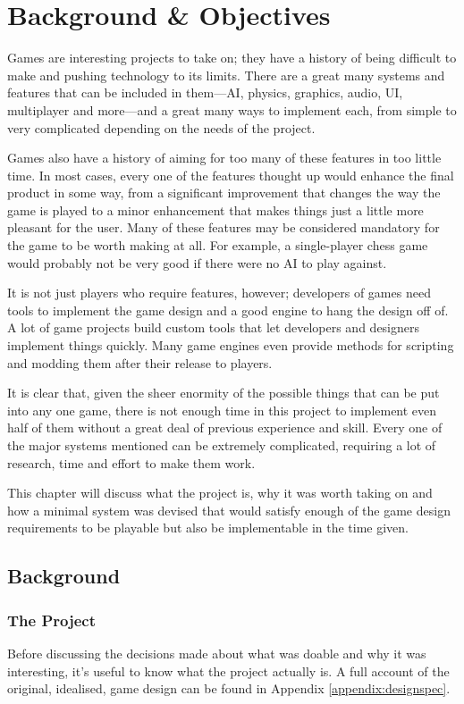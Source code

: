\chapter{Background \& Objectives}

Games are interesting projects to take on; they have a history of being difficult to make and pushing technology to its limits. There are a great many systems and features that can be included in them---AI, physics, graphics, audio, UI, multiplayer and more---and a great many ways to implement each, from simple to very complicated depending on the needs of the project.

Games also have a history of aiming for too many of these features in too little time. In most cases, every one of the features thought up would enhance the final product in some way, from a significant improvement that changes the way the game is played to a minor enhancement that makes things just a little more pleasant for the user. Many of these features may be considered mandatory for the game to be worth making at all. For example, a single-player chess game would probably not be very good if there were no AI to play against.

It is not just players who require features, however; developers of games need tools to implement the game design and a good engine to hang the design off of. A lot of game projects build custom tools that let developers and designers implement things quickly. Many game engines even provide methods for scripting and modding them after their release to players.

It is clear that, given the sheer enormity of the possible things that can be put into any one game, there is not enough time in this project to implement even half of them without a great deal of previous experience and skill. Every one of the major systems mentioned can be extremely complicated, requiring a lot of research, time and effort to make them work.

This chapter will discuss what the project is, why it was worth taking on and how a minimal system was devised that would satisfy enough of the game design requirements to be playable but also be implementable in the time given.

\section{Background}

\subsection{The Project}
Before discussing the decisions made about what was doable and why it was interesting, it's useful to know what the project actually is. A full account of the original, idealised, game design can be found in Appendix \ref{appendix:designspec}.

